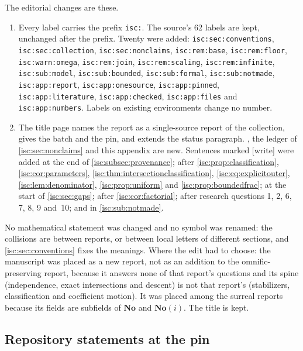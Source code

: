 \documentclass[11pt,letterpaper]{article}
\theoremstyle{definition}
\theoremstyle{remark}
\newcommand{\No}{\mathbf{No}}
\newcommand{\SC}{\No(i)}
\newcommand{\lbl}[1]{\nolinkurl{#1}}%
\newcommand{\wtag}{\textup{[write]}}%
\numberwithin{equation}{section}
\begin{document}
The editorial changes are these.
\begin{enumerate}[label=(\arabic*)]
\item Every label carries the prefix \texttt{isc:}. The source's 62 labels
are kept, unchanged after the prefix. Twenty were added:
\lbl{isc:sec:conventions}, \lbl{isc:sec:collection},
\lbl{isc:sec:nonclaims}, \lbl{isc:rem:base}, \lbl{isc:rem:floor},
\lbl{isc:warn:omega}, \lbl{isc:rem:join}, \lbl{isc:rem:scaling},
\lbl{isc:rem:infinite}, \lbl{isc:sub:model}, \lbl{isc:sub:bounded},
\lbl{isc:sub:formal}, \lbl{isc:sub:notmade}, \lbl{isc:app:report},
\lbl{isc:app:onesource}, \lbl{isc:app:pinned}, \lbl{isc:app:literature},
\lbl{isc:app:checked}, \lbl{isc:app:files} and \lbl{isc:app:numbers}. Labels
on existing environments change no number.
\item The title page names the report as a single-source report of the
collection, gives the batch and the pin, and extends the status paragraph.
, the ledger of
\cref{isc:sec:nonclaims} and this appendix are new. Sentences marked
\wtag{} were added at the end of \cref{isc:subsec:provenance}; after
\cref{isc:prop:classification}, \cref{isc:cor:parameters},
\cref{isc:thm:intersectionclassification}, \eqref{isc:eq:explicitouter},
\cref{isc:lem:denominator}, \cref{isc:prop:uniform} and
\cref{isc:prop:boundedfrac}; at the start of \cref{isc:sec:gaps}; after
\cref{isc:cor:factorial}; after research questions 1, 2, 6, 7, 8, 9 and~10;
and in \cref{isc:sub:notmade}.
\end{enumerate}
No mathematical statement was changed and no symbol was renamed: the
collisions are between reports, or between local letters of different
sections, and \cref{isc:sec:conventions} fixes the meanings. Where the edit
had to choose: the manuscript was placed as a new report, not as an
addition to the omnific-preserving report, because it answers none of that
report's questions and its spine (independence, exact intersections and
descent) is not that report's (stabilizers, classification and
coefficient motion). It was placed among the surreal reports because its
fields are subfields of $\No$ and $\SC$. The title is kept.

\subsection{Repository statements at the pin}\label{isc:app:pinned}
\end{document}
